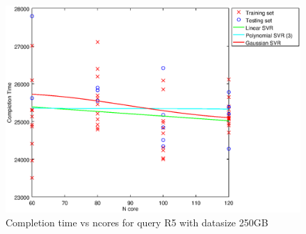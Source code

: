 
\begin {figure}[hbtp]
\centering
\includegraphics[width=\textwidth]{output/R5_250_LINEAR_NCORE/plot_R5_250_bestmodels.eps}
\caption{Completion time vs ncores for query R5 with datasize 250GB}
\label{fig:coreonly_linear_R5_250}
\end {figure}
